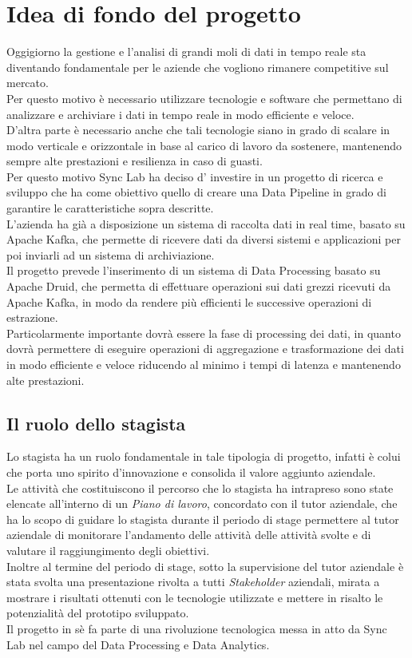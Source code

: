 \section{Idea di fondo del progetto}
Oggigiorno la gestione e l'analisi di grandi moli di dati in tempo reale sta diventando fondamentale 
per le aziende che vogliono rimanere competitive sul mercato. \\ 
Per questo motivo è necessario utilizzare tecnologie e software che permettano di analizzare e archiviare 
i dati in tempo reale in modo efficiente e veloce. \\
D'altra parte è necessario anche che tali tecnologie siano in grado di scalare in modo verticale e orizzontale in base al carico 
di lavoro da sostenere, mantenendo sempre alte prestazioni e resilienza in caso di guasti. \\
Per questo motivo Sync Lab ha deciso d' investire in un progetto di ricerca e sviluppo che ha come obiettivo quello di creare 
una \gls{Data Pipeline}{} in grado di garantire le caratteristiche sopra descritte. \\
L'azienda ha già a disposizione un sistema di raccolta dati in real time, basato su Apache Kafka, che permette di ricevere dati da
diversi sistemi e applicazioni per poi inviarli ad un sistema di archiviazione. \\
Il progetto prevede l'inserimento di un sistema di \gls{Data Processing}{} basato su Apache Druid, che permetta di effettuare operazioni sui dati 
grezzi ricevuti da Apache Kafka, in modo da rendere più efficienti le successive operazioni di estrazione.\\
Particolarmente importante dovrà essere la fase di processing dei dati, in quanto dovrà permettere di eseguire operazioni di aggregazione
e trasformazione dei dati in modo efficiente e veloce riducendo al minimo i tempi di latenza e mantenendo alte prestazioni.\\
\subsection{Il ruolo dello stagista}
Lo stagista ha un ruolo fondamentale in tale tipologia di progetto, infatti è colui che porta uno spirito d'innovazione e consolida il valore aggiunto 
aziendale. \\
Le attività che costituiscono il percorso che lo stagista ha intrapreso sono state elencate all'interno di un \textit{Piano di lavoro}, concordato con il tutor aziendale, che ha lo scopo di guidare lo stagista durante il periodo di stage permettere al 
tutor aziendale di monitorare l'andamento delle attività delle attività svolte e di valutare il raggiungimento degli obiettivi.\\
Inoltre al termine del periodo di stage, sotto la supervisione del tutor aziendale è stata svolta una presentazione rivolta a tutti \textit{Stakeholder} aziendali, mirata a 
mostrare i risultati ottenuti con le tecnologie utilizzate e mettere in risalto le potenzialità del prototipo sviluppato. \\
Il progetto in sè fa parte di una rivoluzione tecnologica messa in atto da Sync Lab nel campo del \gls{Data Processing}{} e \gls{Data Analytics}{}.\\
\pagebreak
